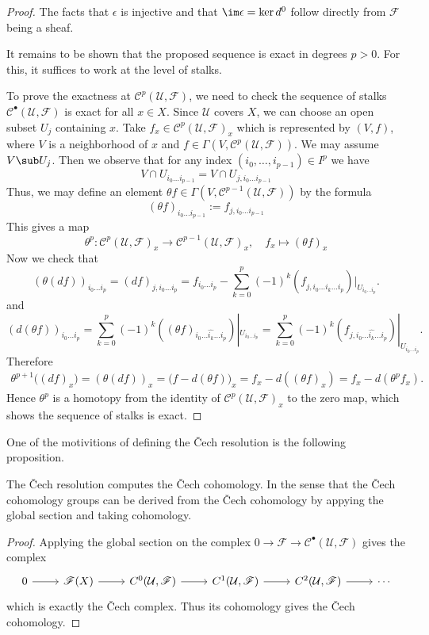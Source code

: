 \begin{proof}
The facts that $\epsilon$ is injective and that $\im\epsilon=\ker d^0$ follow directly from $\mathscr{F}$ being a sheaf.\par
It remains to be shown that the proposed sequence is exact in degrees $p>0$. For this, it suffices to work at the level of stalks.\par
To prove the exactness at $\mathscr{C}^p(\mathcal{U},\mathscr{F})$, we need to check the sequence of stalks $\mathscr{C}^\bullet(\mathcal{U},\mathscr{F})$ is exact for all $x\in X$. Since $\mathcal{U}$ covers $X$, we can choose an open subset $U_j$ containing $x$. Take $f_x\in\mathscr{C}^p(\mathcal{U},\mathscr{F})_x$ which is represented by $(V,f)$, where $V$ is a neighborhood of $x$ and $f\in\Gamma(V,\mathscr{C}^p(\mathcal{U},\mathscr{F}))$. We may assume $V\sub U_j$. Then we observe that for any index $(i_0,\dots,i_{p-1})\in I^p$ we have
\[V\cap U_{i_0\dots i_{p-1}}=V\cap U_{j,i_0\dots i_{p-1}}\]
Thus, we may define an element $\theta f\in\Gamma(V,\mathscr{C}^{p-1}(\mathcal{U},\mathscr{F}))$ by the formula
\[(\theta f)_{i_0\dots i_{p-1}}:=f_{j,i_0\dots i_{p-1}}\]
This gives a map \[\theta^p:\mathscr{C}^p(\mathcal{U},\mathscr{F})_x\to\mathscr{C}^{p-1}(\mathcal{U},\mathscr{F})_x,\quad f_x\mapsto (\theta f)_x\]
Now we check that
\[(\theta(df))_{i_0\dots i_p}=(df)_{j,i_0\dots i_p}=f_{i_0\dots i_p}-\sum_{k=0}^{p}(-1)^k(f_{j,i_0\dots\widehat{i_k}\dots i_p})|_{U_{i_0\dots i_p}}.\]
and
\[(d(\theta f))_{i_0\dots i_p}=\sum_{k=0}^{p}(-1)^k((\theta f)_{i_0\dots\widehat{i_k}\dots i_p})|_{U_{i_0\dots i_p}}=\sum_{k=0}^{p}(-1)^k(f_{j,i_0\dots\widehat{i_k}\dots i_p})|_{U_{i_0\dots i_p}}.\]
Therefore
\begin{align*}
\theta^{p+1}\big((df)_x\big)=(\theta(df))_x=\big(f-d(\theta f)\big)_x=f_x-d((\theta f)_x)=f_x-d(\theta^pf_x).
\end{align*}
Hence $\theta^p$ is a homotopy from the identity of $\mathscr{C}^p(\mathcal{U},\mathscr{F})_x$ to the zero map, which shows the sequence of stalks is exact.
\end{proof}
One of the motivitions of defining the \v{C}ech resolution is the following proposition.
\begin{proposition}
The \v{C}ech resolution computes the \v{C}ech cohomology. In the sense that the \v{C}ech cohomology groups can be derived from the \v{C}ech cohomology by appying the global section and taking cohomology.
\end{proposition}
\begin{proof}
Applying the global section on the complex $0\to\mathscr{F}\to\mathscr{C}^\bullet(\mathcal{U},\mathscr{F})$ gives the complex
\[\begin{tikzcd}
0\ar[r]&\mathscr{F}(X)\ar[r]&C^0(\mathcal{U},\mathscr{F})\ar[r]&C^1(\mathcal{U},\mathscr{F})\ar[r]&C^2(\mathcal{U},\mathscr{F})\ar[r]&\cdots
\end{tikzcd}\]
which is exactly the \v{C}ech complex. Thus its cohomology gives the \v{C}ech cohomology.
\end{proof}
